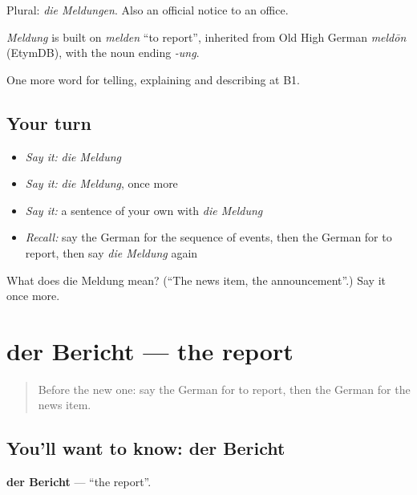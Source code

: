 Plural: \emph{die Meldungen}. Also an official notice to an office.

\begin{cousinweb}
\emph{Meldung} is built on \emph{melden} \textquotedblleft{}to report\textquotedblright{}, inherited from Old High German \emph{meldōn} (EtymDB), with the noun ending \emph{-ung}.
\end{cousinweb}

\begin{grammarlens}[title={What you've built}]
One more word for telling, explaining and describing at B1.
\end{grammarlens}

\subsection*{Your turn}
\begin{itemize}
\raggedright
  \item \emph{Say it:} \emph{die Meldung}
  \item \emph{Say it:} \emph{die Meldung}, once more
  \item \emph{Say it:} a sentence of your own with \emph{die Meldung}
  \item \emph{Recall:} say the German for the sequence of events, then the German for to report, then say \emph{die Meldung} again
\end{itemize}

\begin{tcolorbox}[breakable,colback=teal!4,colframe=teal!35!black,title={Before you move on}]
What does die Meldung mean? (\textquotedblleft{}The news item, the announcement\textquotedblright{}.) Say it once more.
\end{tcolorbox}
\section[der Bericht]{der Bericht — the report}

\label{lesson:GE-C271-bericht}



\begin{quote}
Before the new one: say the German for to report, then the German for the news item.
\end{quote}

\subsection*{You'll want to know: der Bericht}
\textbf{der Bericht} — \textquotedblleft{}the report\textquotedblright{}.

